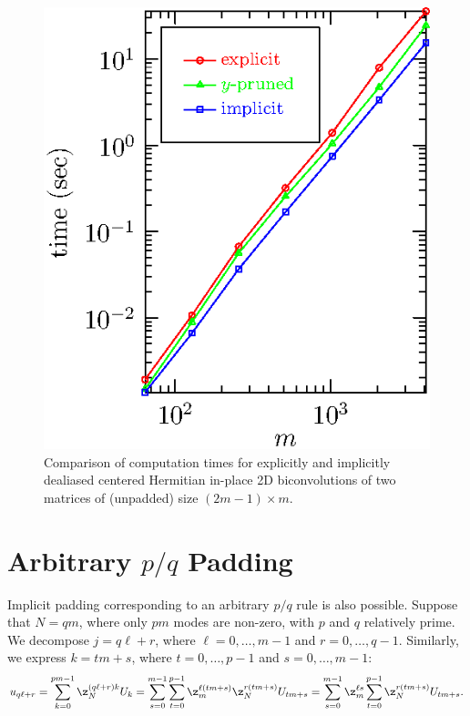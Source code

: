 \documentclass[final]{siamltex}
\begin{document}
\begin{figure}[htbp]
\begin{center}
\begin{minipage}{0.49\linewidth}
\begin{center}
\includegraphics{timing2b}
\caption{Comparison of computation times for explicitly and implicitly
dealiased centered Hermitian in-place 2D biconvolutions of two matrices of
(unpadded) size $(2m-1)\times m$.}
\label{timing2b}
\end{center}
\end{minipage}
\end{center}
\end{figure}

\section{Arbitrary $p/q$ Padding}

Implicit padding corresponding to an arbitrary $p/q$ rule is also
possible. Suppose that $N=qm$, where only $pm$ modes are non-zero, with $p$
and $q$ relatively prime. We decompose $j=q\ell+r$, where
$\ell=0,\dots,m-1$ and $r=0,\dots,q-1$.
Similarly, we express $k=t m+s$, where $t=0,\dots,p-1$ and $s=0,\dots, m-1$:
$$
u_{q\ell+r}=\sum_{k=0}^{pm-1}\z_N^{(q\ell+r)k} U_k
=\sum_{s=0}^{m-1}\sum_{t=0}^{p-1} \z_m^{\ell (t m+s)}\z_{N}^{r(t m+s)}
U_{t m+s}
=\sum_{s=0}^{m-1}\z_m^{\ell s}\sum_{t=0}^{p-1}\z_N^{r(t m+s)} U_{t m+s}.
$$
\end{document}
